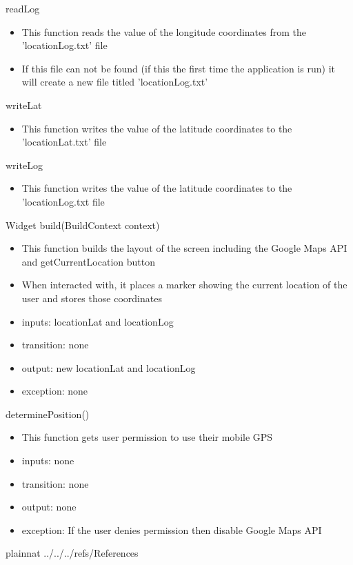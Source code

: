\documentclass[12pt, titlepage]{article}
\begin{document}
\noindent readLog
\begin{itemize}
\item This function reads the value of the longitude coordinates from the 'locationLog.txt' file
\item If this file can not be found (if this the first time the application is run) it will create a new file titled 'locationLog.txt'
\end{itemize}

\noindent writeLat
\begin{itemize}
\item This function writes the value of the latitude coordinates to the 'locationLat.txt' file
\end{itemize}

\noindent writeLog
\begin{itemize}
\item This function writes the value of the latitude coordinates to the 'locationLog.txt file
\end{itemize}

\noindent Widget build(BuildContext context)
\begin{itemize}
\item This function builds the layout of the screen including the Google Maps API and getCurrentLocation button
\item When interacted with, it places a marker showing the current location of the user and stores those coordinates
\end{itemize}

\begin{itemize}
\item inputs: locationLat and locationLog
\item transition: none
\item output: new locationLat and locationLog
\item exception: none
\end{itemize}

\noindent determinePosition()
\begin{itemize}
\item This function gets user permission to use their mobile GPS
\end{itemize}

\begin{itemize}
\item inputs: none
\item transition: none
\item output: none
\item exception: If the user denies permission then disable Google Maps API 
\end{itemize}




\newpage

 {plainnat}
 {../../../refs/References}



\end{document}
